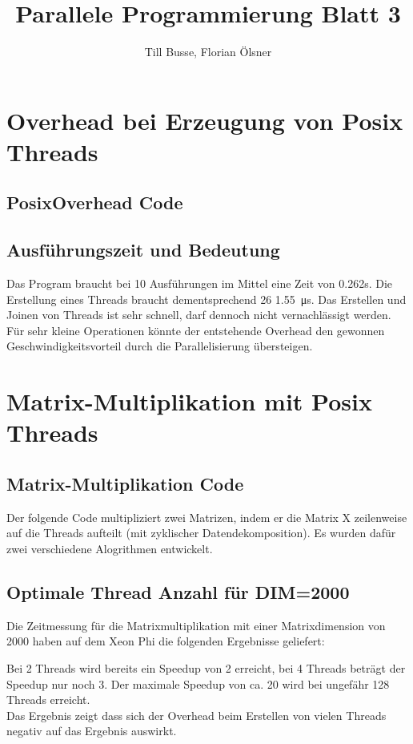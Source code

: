 \documentclass[12pt,a4paper]{article}
\author{Till Busse, Florian Ölsner}
\title{Parallele Programmierung Blatt 3}
\begin{document}
\maketitle
\pagebreak
\section{Overhead bei Erzeugung von Posix Threads}
\subsection{PosixOverhead Code}
\lstset{escapechar=@,style=customc}

\subsection{Ausführungszeit und Bedeutung}
Das Program braucht bei 10 Ausführungen im Mittel eine Zeit von 0.262s. Die Erstellung eines Threads braucht dementsprechend 26 \SI{1.55}{\micro\second}. Das Erstellen und Joinen von Threads ist sehr schnell, darf dennoch nicht vernachlässigt werden. Für sehr kleine Operationen könnte der entstehende Overhead den gewonnen Geschwindigkeitsvorteil durch die Parallelisierung übersteigen.
\pagebreak
\section{Matrix-Multiplikation mit Posix Threads}
\subsection{Matrix-Multiplikation Code}
Der folgende Code multipliziert zwei Matrizen, indem er die Matrix X zeilenweise auf die Threads aufteilt (mit zyklischer Datendekomposition). Es wurden dafür zwei verschiedene Alogrithmen entwickelt. 


\subsection{Optimale Thread Anzahl für DIM=2000}
Die Zeitmessung für die Matrixmultiplikation mit einer Matrixdimension von 2000 haben auf dem Xeon Phi die folgenden Ergebnisse geliefert:

Bei 2 Threads wird bereits ein Speedup von 2 erreicht, bei 4 Threads beträgt der Speedup nur noch 3. Der maximale Speedup von ca. 20 wird bei ungefähr 128 Threads erreicht.\\
Das Ergebnis zeigt dass sich der Overhead beim Erstellen von vielen Threads negativ auf das Ergebnis auswirkt.
\end{document}
